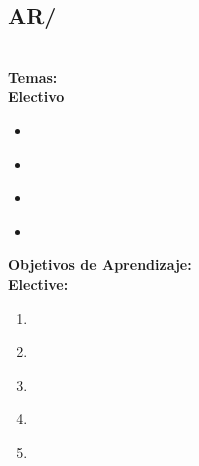 \subsection{AR/\ARFunctionalorganization}\label{sec:BOK:ARFunctionalorganization}
\ARFunctionalorganizationDescription\\
\noindent \textbf{Temas:}\\
\noindent \textbf{Electivo}
\begin{itemize}
	\item \ARFunctionalorganizationTopicImplementation\label{sec:BOK:ARFunctionalorganizationTopicImplementation}
	\item \ARFunctionalorganizationTopicControl\label{sec:BOK:ARFunctionalorganizationTopicControl}
	\item \ARFunctionalorganizationTopicInstruction\label{sec:BOK:ARFunctionalorganizationTopicInstruction}
	\item \ARFunctionalorganizationTopicIntroductionTo\label{sec:BOK:ARFunctionalorganizationTopicIntroductionTo}
\end{itemize}


\noindent \textbf{Objetivos de Aprendizaje:}\\
\noindent \textbf{Elective:}
\begin{enumerate}
	\setcounter{enumi}{0}
	\item \ARFunctionalorganizationLOCompareAlternative\xspace[\ARFunctionalorganizationLOCompareAlternativeLevel]\label{sec:BOK:ARFunctionalorganizationLOCompareAlternative}
	\item \ARFunctionalorganizationLODiscussTheControl\xspace[\ARFunctionalorganizationLODiscussTheControlLevel]\label{sec:BOK:ARFunctionalorganizationLODiscussTheControl}
	\item \ARFunctionalorganizationLOExplainBasic\xspace[\ARFunctionalorganizationLOExplainBasicLevel]\label{sec:BOK:ARFunctionalorganizationLOExplainBasic}
	\item \ARFunctionalorganizationLODesignAnd\xspace[\ARFunctionalorganizationLODesignAndLevel]\label{sec:BOK:ARFunctionalorganizationLODesignAnd}
	\item \ARFunctionalorganizationLODetermineFor\xspace[\ARFunctionalorganizationLODetermineForLevel]\label{sec:BOK:ARFunctionalorganizationLODetermineFor}
\end{enumerate}


